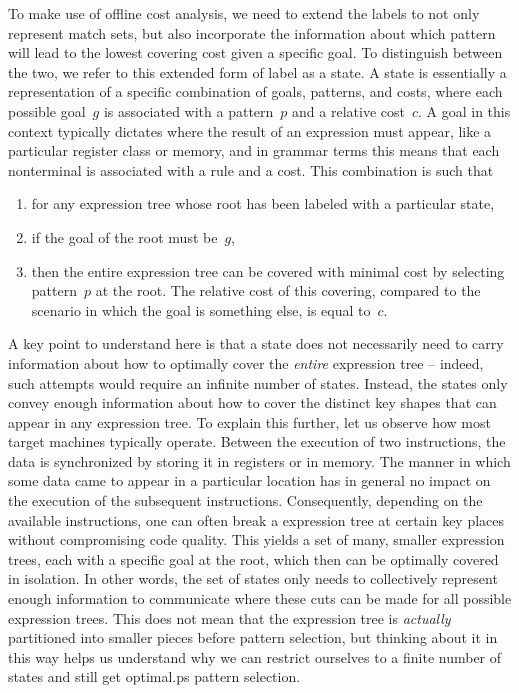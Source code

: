 To make use of \gls{offline cost analysis}, we need to extend the labels to not
only represent \glspl{match set}, but also incorporate the information about
which \gls{pattern} will lead to the lowest covering cost given a specific goal.
%
To distinguish between the two, we refer to this extended form of label as a
\gls{state}.
%
A \gls{state} is essentially a representation of a specific combination of
goals, \glspl{pattern}, and costs, where each possible goal~$g$ is associated
with a \gls{pattern}~$p$ and a relative cost~$c$.
%
A goal in this context typically dictates where the result of an expression must
appear, like a particular \gls{register class} or memory, and in \gls{grammar}
terms this means that each \gls{nonterminal} is associated with a \gls{rule} and
a cost.
%
This combination is such that
%
\begin{enumerate}
  \item for any \gls{expression tree} whose \gls{root} has been labeled with a
    particular \gls{state},
  \item if the goal of the \gls{root} must be~$g$,
  \item then the entire \gls{expression tree} can be covered with minimal cost
    by selecting \gls{pattern}~$p$ at the \gls{root}.
    The relative cost of this covering, compared to the scenario in which the
    goal is something else, is equal to~$c$.
\end{enumerate}

A key point to understand here is that a \gls{state} does not necessarily need
to carry information about how to optimally cover the \emph{entire}
\gls{expression tree} -- indeed, such attempts would require an infinite number
of \glspl{state}.
%
Instead, the \glspl{state} only convey enough information about how to cover the
distinct key shapes that can appear in any \gls{expression tree}.
%
To explain this further, let us observe how most \glspl{target machine}
typically operate.
%
Between the execution of two \glspl{instruction}, the data is synchronized by
storing it in \glspl{register} or in memory.
%
The manner in which some data came to appear in a particular location has in
general no impact on the execution of the subsequent \glspl{instruction}.
%
Consequently, depending on the available \glspl{instruction}, one can often
break a \gls{expression tree} at certain key places without compromising code
quality.
%
This yields a set of many, smaller \glspl{expression tree}, each with a specific
goal at the \gls{root}, which then can be optimally covered in isolation.
%
In other words, the set of \glspl{state} only needs to collectively represent
enough information to communicate where these cuts can be made for all possible
\glspl{expression tree}.
%
This does not mean that the \gls{expression tree} is \emph{actually} partitioned
into smaller pieces before \gls{pattern selection}, but thinking about it in
this way helps us understand why we can restrict ourselves to a finite number of
\glspl{state} and still get \gls{optimal.ps} \gls{pattern selection}.

